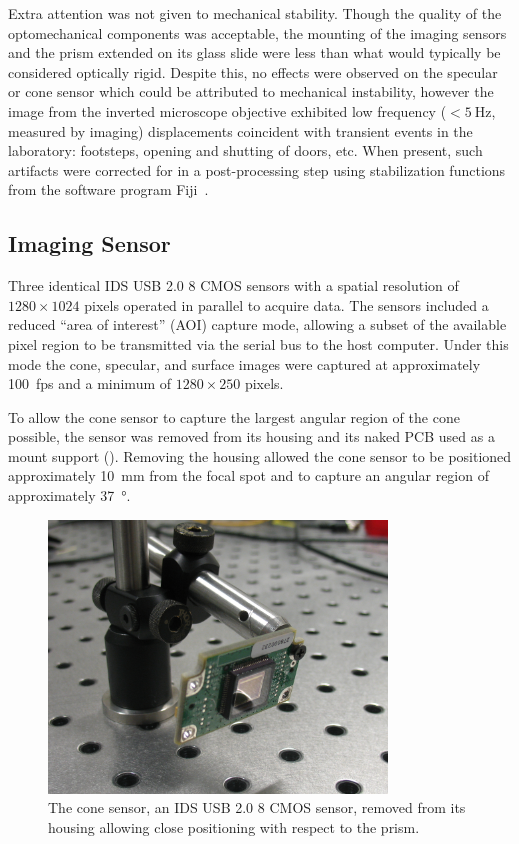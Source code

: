 Extra attention was not given to mechanical stability.  Though the quality of
the optomechanical components was acceptable, the mounting of the imaging
sensors and the prism extended on its glass slide were less than what would
typically be considered optically rigid.  Despite this, no effects were
observed on the specular or cone sensor which could be attributed to
mechanical instability, however the image from the inverted microscope
objective exhibited low frequency ($<\SI{5}{\hertz}$, measured by imaging)
displacements coincident with transient events in the laboratory: footsteps,
opening and shutting of doors, etc.  When present, such artifacts were
corrected for in a post-processing step using stabilization functions from the
software program Fiji~\cite{schindelin2012fiji}.

\subsection{Imaging Sensor}

Three identical IDS USB 2.0 \SI{8}{\bit} CMOS sensors with a spatial
resolution of $1280\times1024$ pixels operated in parallel to acquire data.
The sensors included a reduced ``area of interest'' (AOI) capture mode,
allowing a subset of the available pixel region to be transmitted via the
serial bus to the host computer.  Under this mode the cone, specular, and
surface images were captured at approximately \SI{100}{fps} and a minimum of $1280\times250$ pixels.

To allow the cone sensor to capture the largest angular region of the cone
possible, the sensor was removed from its housing and its naked PCB used as
a mount support ().  Removing the housing allowed
the cone sensor to be positioned approximately \SI{10}{\milli\meter} from
the focal spot and to capture an angular region of approximately
\SI{37}{\degree}.
\begin{figure}[ht]
  \centering
  \includegraphics[width=9cm,keepaspectratio]{experimental/figures/nakedsensorcrop.jpg}
  \caption{The cone sensor, an IDS USB 2.0 \SI{8}{\bit} CMOS sensor, removed from its housing allowing close positioning with respect to the prism.}
  \label{fig:imagingsensor}
\end{figure}

